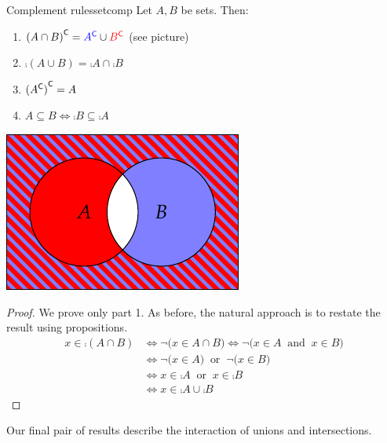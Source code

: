 \begin{thm}[lower separated=false, sidebyside, sidebyside align=top seam, sidebyside gap=0pt, righthand width=0.4\linewidth]{Complement rules}{setcomp}
	Let $A,B$ be sets. Then:
	\begin{enumerate}\itemsep2pt
		\item ${(A\cap B)}^{\mathsf{C}}=\textcolor{blue}{{A}^{\mathsf{C}}}\cup \textcolor{red}{{B}^{\mathsf{C}}}$ (see picture)
		\item $\comp{(A\cup B)}=\comp A\cap \comp B$
		\item $\smash[t]{{({A}^{\mathsf{C}})}^{\mathsf{C}}}=A$
		\item $A\subseteq B\iff \comp B\subseteq \comp A$
	\end{enumerate}
	\tcblower
	\flushright
	\includegraphics[scale=1]{sets-08-venndemorgan2}
\end{thm}

\begin{proof}
	We prove only part 1. As before, the natural approach is to restate the result using propositions.
	\begin{align*}
		x\in\comp{(A\cap B)}&\iff \neg\bigl(x\in A\cap B\bigr) \iff \neg\bigl(x\in A\ \text{ and }\  x\in B\bigr)\\
		&\iff \neg\bigl(x\in A\bigr)\ \text{ or }\ \neg\bigl(x\in B\bigr) \tag*{(de Morgan's first law of logic)}\\
		&\iff x\in\comp A\ \text{ or }\ x\in\comp B\\
		&\iff x\in\comp A\cup\comp B\tag*{\qedhere}
	\end{align*}
\end{proof}

Our final pair of results describe the interaction of unions and intersections.\par

